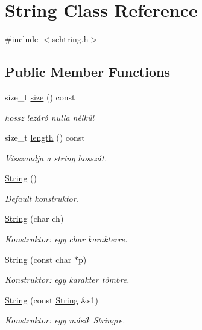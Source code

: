 \hypertarget{class_string}{}\section{String Class Reference}
\label{class_string}


{\ttfamily \#include $<$schtring.\+h$>$}

\subsection*{Public Member Functions}
\begin{DoxyCompactItemize}
\item 
size\+\_\+t \mbox{\hyperlink{class_string_a588c5cc9faededbb9d938662d354feed}{size}} () const
\begin{DoxyCompactList}\small\item\em hossz lezáró nulla nélkül \end{DoxyCompactList}\item 
size\+\_\+t \mbox{\hyperlink{class_string_ad3b888edbfb3bab21d4bae4663d2211a}{length}} () const
\begin{DoxyCompactList}\small\item\em Visszaadja a string hosszát. \end{DoxyCompactList}\item 
\mbox{\hyperlink{class_string_a8a7ef356e05eb9b1ea1ab518baee3095}{String}} ()
\begin{DoxyCompactList}\small\item\em Default konstruktor. \end{DoxyCompactList}\item 
\mbox{\hyperlink{class_string_a62a77180f8df2547e8be1313654abcee}{String}} (char ch)
\begin{DoxyCompactList}\small\item\em Konstruktor\+: egy char karakterre. \end{DoxyCompactList}\item 
\mbox{\hyperlink{class_string_a09ca4f1436a83ecb1c273a836b7cd4c6}{String}} (const char $\ast$p)
\begin{DoxyCompactList}\small\item\em Konstruktor\+: egy karakter tömbre. \end{DoxyCompactList}\item 
\mbox{\hyperlink{class_string_a3c682dc983b45bdbb7f3858fe4cbf221}{String}} (const \mbox{\hyperlink{class_string}{String}} \&s1)
\begin{DoxyCompactList}\small\item\em Konstruktor\+: egy másik Stringre. \end{DoxyCompactList}\item 

\end{DoxyCompactItemize}
